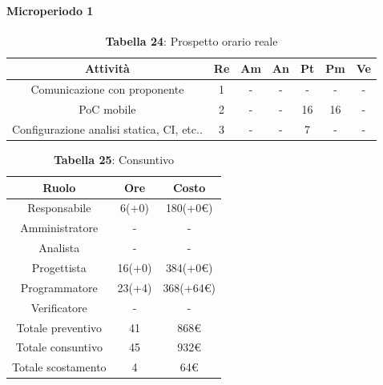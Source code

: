 \paragraph{Microperiodo 1}
\begin{table}[H]
	\centering
	\begin{tabular}{|c|c|c|c|c|c|c|}
		\hline
		\rowcolor{lighter-grayer}
		\textbf{Attività} & \textbf{Re}        & \textbf{Am}        & \textbf{An}        & \textbf{Pt}        & \textbf{Pm}        & \textbf{Ve}        \\ \hline
		
		Comunicazione con proponente & 1 & - & - & - & - & - \\ \hline
		PoC mobile & 2 & - & - & 16 & 16 & - \\ \hline
		Configurazione analisi statica, CI, etc.. & 3 & - & - & 7 & - & - \\ \hline
		
	\end{tabular}
	\caption*{\textbf{Tabella 24}: Prospetto orario reale\\}
\end{table}

\begin{table}[H]
	\centering
	\renewcommand{\arraystretch}{1.5}
	\begin{tabular}{|c|c|c|}
		\hline
		\rowcolor{lighter-grayer}
		Ruolo & Ore & Costo \\ \hline
		Responsabile & 6(+0) & 180(+0\euro) \\ \hline
		Amministratore & - & - \\ \hline
		Analista & - & - \\ \hline
		Progettista & 16(+0) & 384(+0\euro) \\ \hline
		Programmatore & 23(+4) & 368(+64\euro) \\ \hline
		Verificatore & - & - \\ \hline
		Totale preventivo & 41 & 868\euro \\ \hline
		Totale consuntivo & 45 & 932\euro \\ \hline
		Totale scostamento & 4 & 64\euro \\ \hline
	\end{tabular}
	\caption*{\textbf{Tabella 25}: Consuntivo\\}
\end{table}

